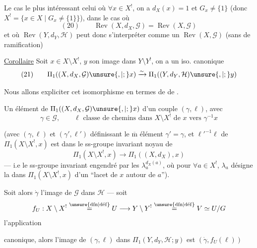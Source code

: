 
Le cas le plus intéressant  celui où  $\forall x\in X^{!}$, on a $d_X(x)=1$ et $G_x\ne\{1\}$ (donc $X^{!}=\{x\in X\mid G_x\ne\{1\}\}$), dans le cas où
\[
(20)\qquad\operatorname{Rev}(X,d_X,\mathcal{G})=\operatorname{Rev}(X,\mathcal{G})
\]
et où $\operatorname{Rev}(Y,d_Y,\mathcal{H})$ peut donc s'interpréter comme un $\operatorname{Rev}(X,\mathcal{G})$ (sans  de ramification)



\uline{Corollaire} Soit $x\in X\setminus X^{!}$, $y$ son image dans $Y\setminus Y^{!}$, on a un iso. canonique
\[
(21)\qquad
\Pi_1((X,d_X,\mathcal{G})\unsure{,|;}x)\xrightarrow{\sim}\Pi_1((Y,d_Y,\mathcal{H})\unsure{,|;}y)
\]

Nous allons expliciter cet isomorphisme en termes de  de .

Un élément \inserted{$\alpha$} de $\Pi_1((X,d_X,\mathcal{G})\unsure{,|;}x)$  d'un couple $(\gamma,\ell)$, avec
\[
\gamma\in\mathcal{G},\qquad \ell\text{ classe de chemins dans }X\setminus X^{!}\text{ de }x\text{ vers }\gamma^{-1}x
\]

(avec $(\gamma,\ell)$ et $(\gamma',\ell')$ définissant le $\overline{\mathrm m}$ élément  $\gamma'=\gamma$, et  ${\ell'}^{-1}\ell$ de $\Pi_1(X\setminus X^{!},x)$ est dans le ss-groupe invariant noyau de
\[
\Pi_1(X\setminus X^{!},x)\longrightarrow\Pi_1((X,d_X),x)
\]
--- i.e le ss-groupe invariant engendré par les  $\lambda_a^{d_X(a)}$, où pour $\forall a\in X^{!}$, $\lambda_a$ désigne la  dans $\Pi_1(X\setminus X^{!},x)$ d'un ``lacet de $x$ autour de $a$'').

Soit alors $\dot\gamma$ l'image de $\mathcal{G}$ dans $\mathcal{H}$ ---  soit
\[
f_U:X\setminus X^{!}\overset{\unsure{\mathrm{dfn}|\mathrm{d\acute{e}f}}}{=}U\longrightarrow Y\setminus Y^{!}\overset{\unsure{\mathrm{dfn}|\mathrm{d\acute{e}f}}}{=}V\simeq U/G
\]
l'application



canonique, alors l'image \inserted{$\beta$} de  $(\gamma,\ell)$  dans $\Pi_1(Y,d_Y,\mathcal H;y)$ est $(\dot\gamma,f_U(\ell))$

